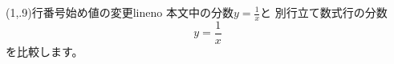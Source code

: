 \begin{showProg}[11](1,.9){行番号始め値の変更}{lineno}
本文中の分数$y=\frac1x$と
別行立て数式行の分数
\[
  y = \frac1x
\]
を比較します。
\end{showProg}
